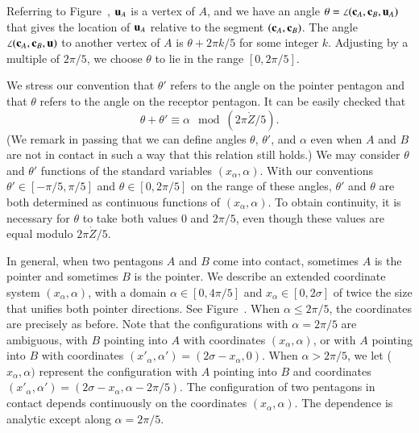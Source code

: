 Referring to Figure~, ${\mathbf u}_A$ is a vertex of $A$, and we
have an angle $\theta = \angle({\mathbf c}_A,{\mathbf c}_B,{\mathbf u}_A)$ that gives the
location of ${\mathbf u}_A$ relative to the segment $({\mathbf c}_A,{\mathbf c}_B)$.  The angle
$\angle({\mathbf c}_A,{\mathbf c}_B,{\mathbf u})$ to another vertex of $A$ is $\theta + 2\pi k/5$
for some integer $k$.  Adjusting by a multiple of $2\pi/5$, we choose
$\theta$ to lie in the range $[0,2\pi/5]$.

We stress our convention that $\theta'$ refers to the angle on the
pointer pentagon and that $\theta$ refers to the angle on the receptor
pentagon.  It can be easily checked that 
\begin{equation}
\theta+\theta' \equiv \alpha \mod (2\pi\ring{Z}/5).
\end{equation}
(We remark in passing that we can define angles $\theta$, $\theta'$,
and $\alpha$ even when $A$ and $B$ are not in contact in such a way
that this relation still holds.)  We may consider $\theta$ and
$\theta'$ functions of the standard variables $(x_\alpha,\alpha)$.  With
our conventions $\theta'\in [-\pi/5,\pi/5]$ and $\theta\in [0,2\pi/5]$
on the range of these angles, $\theta'$ and $\theta$ are both
determined as continuous functions of $(x_\alpha,\alpha)$.  To obtain
continuity, it is necessary for $\theta$ to take both values $0$ and
$2\pi/5$, even though these values are equal modulo $2\pi\ring{Z}/5$.

In general, when two pentagons $A$ and $B$ come into contact,
sometimes $A$ is the pointer and sometimes $B$ is the pointer.  We
describe an extended coordinate system $(x_\alpha,\alpha)$, with a
domain $\alpha\in[0,4\pi/5]$ and $x_\alpha\in[0,2\sigma]$ of twice the
size that unifies both pointer directions.  See
Figure~.  When $\alpha\le2\pi/5$, the coordinates are
precisely as before.  Note that the configurations with $\alpha=2\pi/5$
are ambiguous, with $B$ pointing into $A$ with coordinates
$(x_\alpha,\alpha)$, or with $A$ pointing into $B$ with coordinates
$(x'_\alpha,\alpha')=(2\sigma - x_\alpha,0)$.  When $\alpha > 2\pi/5$, we
let ($x_\alpha,\alpha)$ represent the configuration with $A$ pointing
into $B$ and coordinates $(x'_\alpha,\alpha') =
(2\sigma-x_\alpha,\alpha-2\pi/5)$.  The configuration of two pentagons
in contact depends continuously on the coordinates $(x_\alpha,\alpha)$.
The dependence is analytic except along $\alpha=2\pi/5$.

